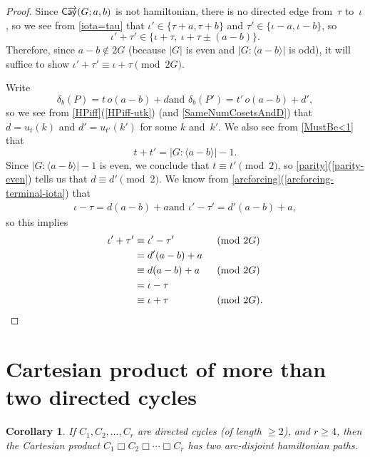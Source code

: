 \documentclass[11pt]{amsart}
\newtheorem{cor}[equation]{Corollary}
\newcommand{\fullcref}[2]{\cref{#1}(\ref{#1-#2})}
\theoremstyle{definition}
\numberwithin{case}{startcases}
\numberwithin{equation}{section}
\newcommand{\cartprod}{\mathbin{\Box}}
\newcommand{\cayd}{\mathop{\mathsf{C}\mkern-1mu\overrightarrow{\mathsf{ay}}}}
\begin{document}
	\begin{proof}
		Since $\cayd(G; a,b)$ is not hamiltonian, there is no directed edge from~$\tau$ to~$\iota$, so we see from \cref{iota=tau} that 
		$\iota' \in \{\tau + a, \tau + b\}$
		and
		$\tau' \in \{\iota - a, \iota - b\}$,
		so
		\[ \iota' + \tau' \in 
		\{\iota + \tau, \ \iota + \tau \pm (a - b) \} . \]
		Therefore, since $a - b \notin 2G$ (because $|G|$ is even and $|G : \langle a - b \rangle|$ is odd), it will suffice to show $\iota' + \tau' \equiv \iota + \tau \pmod{2G}$.
		
		Write
		\[ \text{$\delta_b(P) = t \, o(a - b) + d$
			\ and \ 
			$\delta_b(P') = t' \, o(a - b) + d'$} , \]
		so we see from \fullcref{HPiff}{utk} (and \cref{SameNumCosetsAndD}) that $d = u_t(k)$ and $d' = u_{t'}(k')$ for some $k$ and~$k'$. We also see from \cref{MustBe<1} that
		\[ t + t' = |G : \langle a - b \rangle| - 1 . \]
		Since $|G : \langle a - b \rangle| - 1$ is even, we conclude that $t \equiv t' \pmod{2}$, so \fullcref{parity}{even} tells us that $d \equiv d' \pmod{2}$. 
		We know from \fullcref{arcforcing}{terminal-iota} that
		\begin{align*}
			\text{$\iota - \tau = d(a - b) + a$
				\ and \ 
				$\iota' - \tau' = d'(a - b) + a$}
			, \end{align*}
		so this implies
		\begin{align*}
			\iota' + \tau'
			&\equiv \iota' - \tau'
			&& \pmod{2G}
			\\&= d'(a - b) + a
			\\&\equiv d(a - b) + a
			&& \pmod{2G}
			\\&= \iota - \tau
			\\&\equiv \iota + \tau
			&& \pmod{2G}
			.  \qedhere \end{align*}
	\end{proof}
	
	
	
	
	
	
	
	
	\section{Cartesian product of more than two directed cycles} \label{C1xC2xC3Sect}
	
	\begin{cor} \label{HamPathsInC1xC2xC3xC4}
		If $C_1,C_2,\ldots,C_r$ are directed cycles \textup(of length $\ge 2$\textup), and $r \geq 4$, then the Cartesian product $C_1 \cartprod C_2 \cartprod \cdots \cartprod C_r$ has two arc-disjoint hamiltonian paths.
	\end{cor}
	
\end{document}
